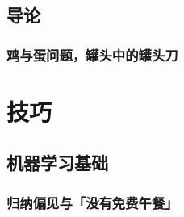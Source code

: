 \documentclass[12pt,a4paper]{report}
\newcommand{\cc}[2]{#1}
\newcommand{\cc}[2]{#2}
\theoremstyle{examples} \newtheorem{example}{Example}[section]
\begin{document}

\tableofcontents

\setcounter{chapter}{-1}
\chapter{\cc{导论}{Introduction}}

	\minitoc
	\section{\cc{鸡与蛋问题，罐头中的罐头刀}{Chicken-and-egg problem}}

\part{\cc{技巧}{Techniques}}

\chapter{\cc{机器学习基础}{Machine learning basics}}

	\minitoc
	\section{\cc{归纳偏见与「没有免费午餐」}{Inductive bias and ``no free lunch'' theorem}}
\end{document}
